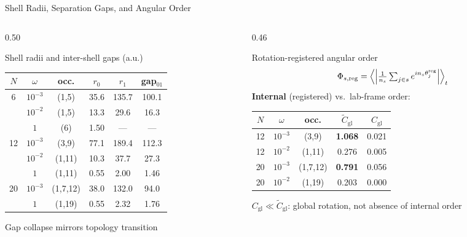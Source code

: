 \documentclass[aspectratio=169,10pt]{beamer}
\begin{document}
\begin{frame}{Shell Radii, Separation Gaps, and Angular Order}
  \begin{columns}[T]
    \begin{column}{0.50\textwidth}
      \begin{block}{Shell radii and inter-shell gaps (a.u.)}
        \small\renewcommand{\arraystretch}{1.2}
        \begin{tabular}{cccccc}
          \toprule
          $N$ & $\omega$ & occ. & $r_0$ & $r_1$ & gap$_{01}$ \\
          \midrule
          6  & $10^{-3}$ & (1,5)  & 35.6 & 135.7 & 100.1 \\
             & $10^{-2}$ & (1,5)  & 13.3 & 29.6  & 16.3  \\
             & $1$       & (6)    & 1.50 & ---   & ---   \\
          \midrule
          12 & $10^{-3}$ & (3,9)  & 77.1 & 189.4 & 112.3 \\
             & $10^{-2}$ & (1,11) & 10.3 & 37.7  & 27.3  \\
             & $1$       & (1,11) & 0.55 & 2.00  & 1.46  \\
          \midrule
          20 & $10^{-3}$ & (1,7,12)&38.0 & 132.0 & 94.0  \\
             & $1$       & (1,19) & 0.55 & 2.32  & 1.76  \\
          \bottomrule
        \end{tabular}
      \end{block}
      \small Gap collapse mirrors topology transition
    \end{column}
    \begin{column}{0.46\textwidth}
      \begin{block}{Rotation-registered angular order}
        \[
          \Phi_{s,\text{reg}}
          = \Bigl\langle
            \Bigl|\tfrac{1}{n_s}
            \textstyle\sum_{j\in s}
            e^{i n_s\theta^{\text{reg}}_j}\Bigr|
            \Bigr\rangle_t
        \]
        \small
        \textbf{Internal} (registered) vs.\ lab-frame order:\\[2pt]
        \begin{tabular}{ccccc}
          \toprule
          $N$ & $\omega$ & occ. & $\tilde C_\text{gl}$ & $C_\text{gl}$ \\
          \midrule
          12 & $10^{-3}$ & (3,9)    & \textbf{1.068} & 0.021 \\
          12 & $10^{-2}$ & (1,11)   & 0.276 & 0.005 \\
          20 & $10^{-3}$ & (1,7,12) & \textbf{0.791} & 0.056 \\
          20 & $10^{-2}$ & (1,19)   & 0.203 & 0.000 \\
          \bottomrule
        \end{tabular}
      \end{block}
      \small $C_\text{gl}\ll\tilde C_\text{gl}$: global rotation,
      not absence of internal order
    \end{column}
  \end{columns}
\end{frame}
\end{document}
